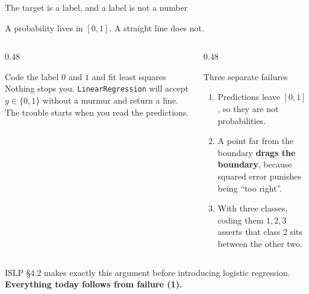 \documentclass[aspectratio=169]{beamer}
\begin{document}
\begin{frame}[shrink=6]{The target is a label, and a label is not a number}
  \begin{exampleblock}{}
    \centering\large
    A probability lives in $[0,1]$. A straight line does not.
  \end{exampleblock}
  \vspace{0.3em}
  \begin{columns}[T]
    \begin{column}{0.48\textwidth}
      \begin{block}{Code the label $0$ and $1$ and fit least squares}
        \small Nothing stops you. \texttt{LinearRegression} will accept
        $y \in \{0,1\}$ without a murmur and return a line. The trouble
        starts when you read the predictions.
      \end{block}
    \end{column}
    \begin{column}{0.48\textwidth}
      \begin{alertblock}{Three separate failures}
        \begin{enumerate}\small
          \item Predictions leave $[0,1]$, so they are not probabilities.
          \item A point far from the boundary \textbf{drags the boundary},
            because squared error punishes being ``too right''.
          \item With three classes, coding them $1,2,3$ asserts that
            class 2 sits between the other two.
        \end{enumerate}
      \end{alertblock}
    \end{column}
  \end{columns}
  \vspace{0.2em}
  \begin{center}\small
    ISLP §4.2 makes exactly this argument before introducing logistic
    regression. \textbf{Everything today follows from failure (1).}
  \end{center}
\end{frame}
\end{document}
